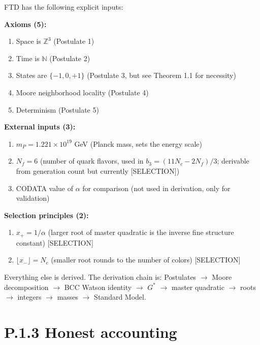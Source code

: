 \documentclass[
  11pt,
  letterpaper,
  twoside,
  openright]{book}
\providecommand{\tightlist}{%
  \setlength{\itemsep}{0pt}\setlength{\parskip}{0pt}}
\begin{document}
FTD has the following explicit inputs:

\textbf{Axioms (5):}

\begin{enumerate}
\def\labelenumi{\arabic{enumi}.}
\tightlist
\item
  Space is \(\mathbb{Z}^3\) (Postulate 1)
\item
  Time is \(\mathbb{N}\) (Postulate 2)
\item
  States are \(\{-1, 0, +1\}\) (Postulate 3, but see Theorem 1.1 for
  necessity)
\item
  Moore neighborhood locality (Postulate 4)
\item
  Determinism (Postulate 5)
\end{enumerate}

\textbf{External inputs (3):}

\begin{enumerate}
\def\labelenumi{\arabic{enumi}.}
\tightlist
\item
  \(m_P = 1.221 \times 10^{19}\) GeV (Planck mass, sets the energy
  scale)
\item
  \(N_f = 6\) (number of quark flavors, used in
  \(b_3 = (11N_c - 2N_f)/3\); derivable from generation count but
  currently {[}SELECTION{]})
\item
  CODATA value of \(\alpha\) for comparison (not used in derivation,
  only for validation)
\end{enumerate}

\textbf{Selection principles (2):}

\begin{enumerate}
\def\labelenumi{\arabic{enumi}.}
\tightlist
\item
  \(x_+ = 1/\alpha\) (larger root of master quadratic is the inverse
  fine structure constant) {[}SELECTION{]}
\item
  \(\lfloor x_- \rfloor = N_c\) (smaller root rounds to the number of
  colors) {[}SELECTION{]}
\end{enumerate}

Everything else is derived. The derivation chain is: Postulates \(\to\)
Moore decomposition \(\to\) BCC Watson identity \(\to\) \(G^*\) \(\to\)
master quadratic \(\to\) roots \(\to\) integers \(\to\) masses \(\to\)
Standard Model.

\section{P.1.3 Honest accounting}\label{p.1.3-honest-accounting}
\end{document}
